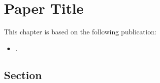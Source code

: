 \documentclass[../main.tex]{subfiles}
\begin{document}
\chapter{Paper Title}
\label{chapter:paper1}
\vspace{-10pt}
This chapter is based on the following publication:
\vspace{-10pt}
\begin{itemize}
    \item {}.
\end{itemize}

\section{Section}
\label{motivation:flow_paper}
\vspace{-10pt}

\lipsum[1]

\biblio
\end{document}
